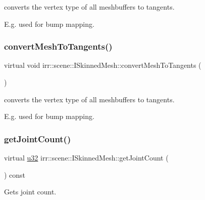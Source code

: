 converts the vertex type of all meshbuffers to tangents. 

E.\+g. used for bump mapping. \mbox{\label{classirr_1_1scene_1_1ISkinnedMesh_ae63f3f1a74bf38c4b5113e3a5b96c0f3}} 
\subsubsection{\texorpdfstring{convert\+Mesh\+To\+Tangents()}{convertMeshToTangents()}\hspace{0.1cm}{\footnotesize\ttfamily [2/2]}}
{\footnotesize\ttfamily virtual void irr\+::scene\+::\+I\+Skinned\+Mesh\+::convert\+Mesh\+To\+Tangents (\begin{DoxyParamCaption}{ }\end{DoxyParamCaption})\hspace{0.3cm}{\ttfamily [pure virtual]}}



converts the vertex type of all meshbuffers to tangents. 

E.\+g. used for bump mapping. \mbox{\label{classirr_1_1scene_1_1ISkinnedMesh_a7715fb82ffec225d2fd9b8aa860e3c38}} 
\subsubsection{\texorpdfstring{get\+Joint\+Count()}{getJointCount()}\hspace{0.1cm}{\footnotesize\ttfamily [1/2]}}
{\footnotesize\ttfamily virtual \hyperlink{namespaceirr_a0416a53257075833e7002efd0a18e804}{u32} irr\+::scene\+::\+I\+Skinned\+Mesh\+::get\+Joint\+Count (\begin{DoxyParamCaption}{ }\end{DoxyParamCaption}) const\hspace{0.3cm}{\ttfamily [pure virtual]}}



Gets joint count. 

